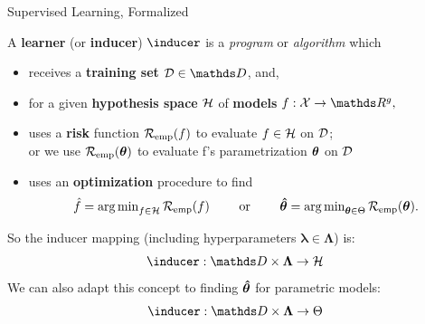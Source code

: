 \documentclass[11pt,compress,t,notes=noshow, xcolor=table]{beamer}
\begin{document}
\begin{vbframe}{Supervised Learning, Formalized}

A \textbf{learner} (or \textbf{inducer}) $\inducer$ is a \emph{program} or
\emph{algorithm} which

\begin{itemize}

  \item receives a \textbf{training set} $\D \in \allDatasets$, and,

  \item for a given \textbf{hypothesis space} $\mathcal{H}$ of \textbf{models}
  $f:\Xspace \rightarrow \R^g,$

  \item uses a \textbf{risk} function $\mathcal{R}_{\text{emp}}(f)$ to evaluate $f \in \mathcal{H}$ on $\mathcal{D}$;\\
  or we use $\mathcal{R}_{\text{emp}}(\bm{\theta})$ to evaluate f's parametrization $\bm{\theta}$ on $\mathcal{D}$

  \item uses an \textbf{optimization} procedure to find
      $$\hat{f} = \operatorname{arg\,min}_{f \in \mathcal{H}} \mathcal{R}_{\text{emp}}(f) \qquad \text{ or } \qquad \bm{\hat\theta} = \operatorname{arg\,min}_{\bm{\theta} \in \Theta} \mathcal{R}_{\text{emp}}(\bm{\theta}).$$

\end{itemize}
So the inducer mapping (including hyperparameters $\bm{\lambda} \in \bm{\Lambda}$) is:
\[\inducer: \preimageInducerShort\rightarrow \Hspace\]
We can also adapt this concept to finding $\bm{\hat\theta}$ for parametric
models:
\[\inducer: \preimageInducerShort \rightarrow \Theta\]






\end{vbframe}



\end{document}
